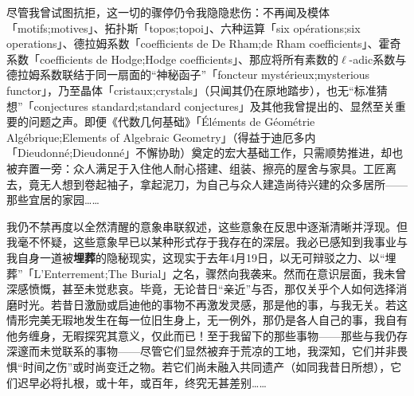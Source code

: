 尽管我曾试图抗拒，这一切的骤停仍令我隐隐悲伤：不再闻及模体「motifs;motives」、拓扑斯「topos;topoi」、六种运算「six opérations;six operations」、德拉姆系数「coefficients de De Rham;de Rham coefficients」、霍奇系数「coefficients de Hodge;Hodge coefficients」、那应将所有素数的$\ell$-adic系数与德拉姆系数联结于同一扇面的“神秘函子”「foncteur mystérieux;mysterious functor」，乃至晶体「cristaux;crystals」（只闻其仍在原地踏步），也无“标准猜想”「conjectures standard;standard conjectures」及其他我曾提出的、显然至关重要的问题之声。即便《代数几何基础》「Éléments de Géométrie Algébrique;Elements of Algebraic Geometry」（得益于迪厄多内「Dieudonné;Dieudonné」不懈协助）奠定的宏大基础工作，只需顺势推进，却也被弃置一旁：众人满足于入住他人耐心搭建、组装、擦亮的屋舍与家具。工匠离去，竟无人想到卷起袖子，拿起泥刀，为自己与众人建造尚待兴建的众多居所——那些宜居的家园……

我仍不禁再度以全然清醒的意象串联叙述，这些意象在反思中逐渐清晰并浮现。但我毫不怀疑，这些意象早已以某种形式存于我存在的深层。我必已感知到我事业与我自身一道被\textbf{埋葬}的隐秘现实，这现实于去年4月19日，以无可辩驳之力、以“埋葬”「L'Enterrement;The Burial」之名，骤然向我袭来。然而在意识层面，我未曾深感愤慨，甚至未觉悲哀。毕竟，无论昔日“亲近”与否，那仅关乎个人如何选择消磨时光。若昔日激励或启迪他的事物不再激发灵感，那是他的事，与我无关。若这情形完美无瑕地发生在每一位旧生身上，无一例外，那仍是各人自己的事，我自有他务缠身，无暇探究其意义，仅此而已！至于我留下的那些事物——那些与我仍存深邃而未觉联系的事物——尽管它们显然被弃于荒凉的工地，我深知，它们并非畏惧“时间之伤”或时尚变迁之物。若它们尚未融入共同遗产（如同我昔日所想），它们迟早必将扎根，或十年，或百年，终究无甚差别……